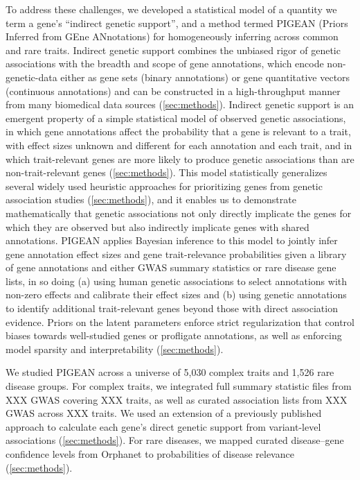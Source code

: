 \documentclass[sn-nature,lineno]{sn-jnl}%
\theoremstyle{thmstyleone}%
\theoremstyle{thmstyletwo}%
\theoremstyle{thmstylethree}%
\begin{document}
To address these challenges, we developed a statistical model of a quantity we term a gene's ``indirect genetic support'', and a method termed PIGEAN (Priors Inferred from GEne ANnotations) for homogeneously inferring across common and rare traits. Indirect genetic support combines the unbiased rigor of genetic associations with the breadth and scope of gene annotations, which encode non-genetic-data either as gene sets (binary annotations) or gene quantitative vectors (continuous annotations) and can be constructed in a high-throughput manner from many biomedical data sources (\ref{sec:methods}). Indirect genetic support is an emergent property of a simple statistical model of observed genetic associations, in which gene annotations affect the probability that a gene is relevant to a trait, with effect sizes unknown and different for each annotation and each trait, and in which trait-relevant genes are more likely to produce genetic associations than are non-trait-relevant genes (\ref{sec:methods}).  This model statistically generalizes several widely used heuristic approaches for prioritizing genes from genetic association studies (\ref{sec:methods}), and it enables us to demonstrate mathematically that genetic associations not only directly implicate the genes for which they are observed but also indirectly implicate genes with shared annotations. PIGEAN applies Bayesian inference to this model to jointly infer gene annotation effect sizes and gene trait-relevance probabilities given a library of gene annotations and either GWAS summary statistics or rare disease gene lists, in so doing (a) using human genetic associations to select annotations with non-zero effects and calibrate their effect sizes and (b) using genetic annotations to identify additional trait-relevant genes beyond those with direct association evidence. Priors on the latent parameters enforce strict regularization that control biases towards well-studied genes or profligate annotations, as well as enforcing model sparsity and interpretability (\ref{sec:methods}).

We studied PIGEAN across a universe of 5,030 complex traits and 1,526 rare disease groups. For complex traits, we integrated full summary statistic files from XXX GWAS covering XXX traits, as well as curated association lists from XXX GWAS across XXX traits. We used an extension of a previously published approach \cite{dornbos_evaluating_2022} to calculate each gene's direct genetic support from variant-level associations (\ref{sec:methods}).  For rare diseases, we mapped curated disease–gene confidence levels from Orphanet to probabilities of disease relevance (\ref{sec:methods}).  
\end{document}
